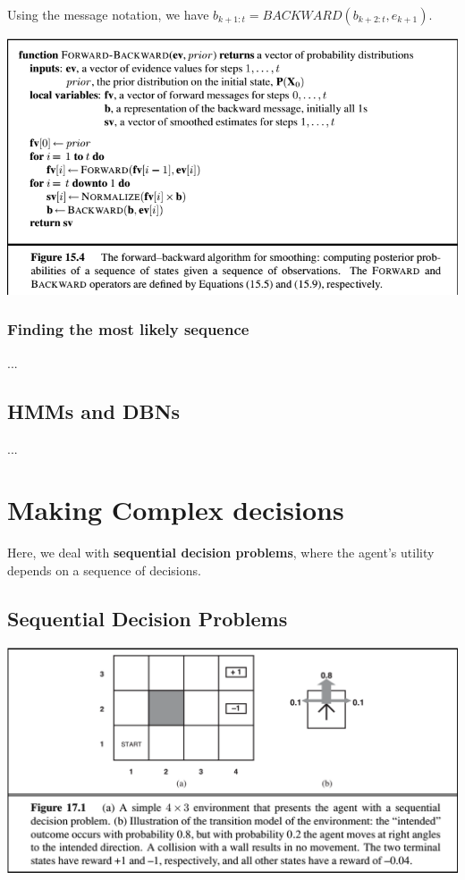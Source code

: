\documentclass{scrartcl}
\begin{document}
Using the message notation, we have \(b_{k+1:t} = BACKWARD(b_{k+2:t}, e_{k+1})\).

\begin{center}
    \includegraphics[scale=0.6]{img/fwdbwd.png}
\end{center}

\subsubsection{Finding the most likely sequence}
...

\subsection{HMMs and DBNs}
...

\section{Making Complex decisions}
Here, we deal with \textbf{sequential decision problems}, where the agent's utility depends on a sequence of decisions.

\subsection{Sequential Decision Problems}
\begin{center}
    \includegraphics[scale=0.41]{img/4x3.png}
\end{center}
\end{document}
